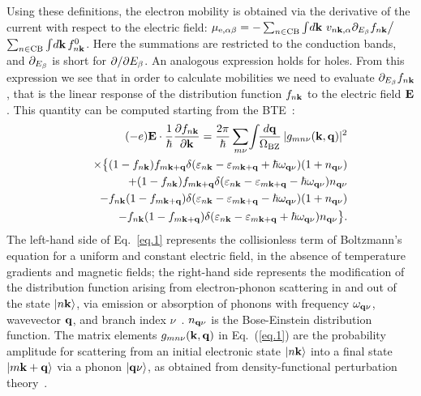 \documentclass[aps,prl,twocolumn,superscriptaddress]{revtex4-1}
\begin{document}
Using these definitions, the electron mobility is obtained via the derivative of the current with respect
to the electric field:
$  \mu_{{\rm e},{\alpha}{\beta}} = -\sum_{n\in {\rm CB}}\int \!d{\bf k}\,\, v_{n{\bf k},{\alpha}}\partial_{E_{\beta}} f_{n{\bf k}}\big/$ 
$\sum_{n\in {\rm CB}} \int \!d{\bf k}\, f_{n{\bf k}}^0$.
Here the summations are restricted to the conduction bands, and $\partial_{E_{\beta}}$ is short for $\partial / \partial E_{\beta}$.
An analogous expression holds for holes. From this expression we see that in order to 
calculate mobilities we need to evaluate $\partial_{E_{\beta}} f_{n{\bf k}}$, that is the linear response of the
distribution function $f_{n{\bf k}}$ to the electric field ${\bf E}$. This quantity can be computed starting from 
the BTE~\cite{Ziman1960}:
  \begin{eqnarray}
  && (-e) {\bf E} \cdot \frac{1}{\hbar} \frac{\partial f_{n{\bf k}}}{\partial {{\bf k}}}  = \frac{2\pi}{\hbar}  
  \sum_{m\nu}\!\int\!\!\frac{d{\bf q}}{\Omega_{\rm BZ}} \, |g_{mn\nu}({\bf k},{\bf q})|^2  \nonumber \\  
  &&\,\,\,\, \times \big\{(1-f_{n{\bf k}})f_{m{\bf k}+{\bf q}}   \delta({\varepsilon}_{n{\bf k}}-{\varepsilon}_{m{\bf k}+{\bf q}} + \hbar\omega_{{\bf q}\nu})(1+ n_{{\bf q}\nu})  \nonumber \\  
  &&\,\,\,\, \,\,\,\,         +(1-f_{n{\bf k}})f_{m{\bf k}+{\bf q}}   \delta({\varepsilon}_{n{\bf k}}-{\varepsilon}_{m{\bf k}+{\bf q}} - \hbar\omega_{{\bf q}\nu})n_{{\bf q}\nu}  \nonumber  \\ 
  &&\,\,\,\, \,\,\,\,       -f_{n{\bf k}}(1-f_{m{\bf k}+{\bf q}})   \delta({\varepsilon}_{n{\bf k}}-{\varepsilon}_{m{\bf k}+{\bf q}} - \hbar\omega_{{\bf q}\nu})(1+ n_{{\bf q}\nu})  \nonumber  \\  
  &&\,\,\,\, \,\,\,\,       -f_{n{\bf k}}(1-f_{m{\bf k}+{\bf q}})   \delta({\varepsilon}_{n{\bf k}}-{\varepsilon}_{m{\bf k}+{\bf q}} + \hbar\omega_{{\bf q}\nu})n_{{\bf q}\nu} \big\}. 
   \label{eq.1}
  \end{eqnarray}
The left-hand side of Eq.~\eqref{eq.1} represents the collisionless term of Boltzmann's equation for 
a uniform and constant electric field, in the absence of temperature gradients and magnetic fields; 
the right-hand side represents the modification of the distribution function arising from electron-phonon 
scattering in and out of the state $|n{\bf k}\rangle$, via emission or absorption of phonons with 
frequency $\omega_{{\bf q}\nu}$, wavevector ${\bf q}$, and branch index $\nu$~\cite{Grimvall1981}. $n_{{\bf q}\nu}$ is the Bose-Einstein distribution function.  
The matrix elements $g_{mn\nu}({\bf k},{\bf q})$ in Eq.~(\ref{eq.1}) are the probability amplitude for scattering 
from an initial electronic state $|n{\bf k}\rangle$ into a final state $|m{\bf k}+{\bf q}\rangle$ via a phonon $|{\bf q}\nu\rangle$, 
as obtained from density-functional perturbation theory~\cite{Baroni2001,Giustino2017}. 
\end{document}
